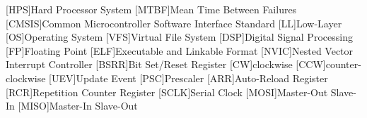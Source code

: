 \begin{acronym}
    [HPS]{Hard Processor System}
    [MTBF]{Mean Time Between Failures}
    [CMSIS]{Common Microcontroller Software Interface Standard}
    [LL]{Low-Layer}
    [OS]{Operating System}
    [VFS]{Virtual File System}
    [DSP]{Digital Signal Processing}
    [FP]{Floating Point}
    [ELF]{Executable and Linkable Format}
    [NVIC]{Nested Vector Interrupt Controller}
    [BSRR]{Bit Set/Reset Register}
    [CW]{clockwise}
    [CCW]{counter-clockwise}
    [UEV]{Update Event}
    [PSC]{Prescaler}
    [ARR]{Auto-Reload Register}
    [RCR]{Repetition Counter Register}
    [SCLK]{Serial Clock}
    [MOSI]{Master-Out Slave-In}
    [MISO]{Master-In Slave-Out}
\end{acronym}